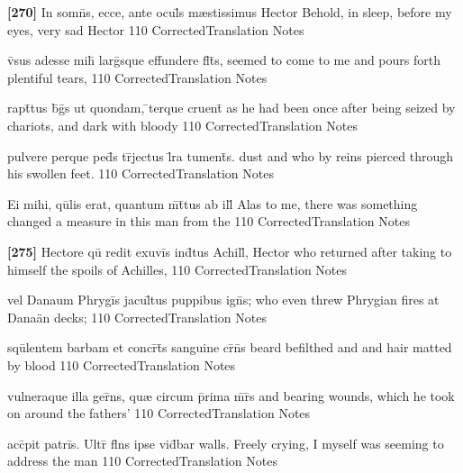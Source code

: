 \latline
  {\textbf{[270]} In somn\={\macron {\i}}s, ecce, ante ocul\={}s m{\ae}stissimus Hector}
  { Behold, in sleep, before my eyes,  very sad Hector   }
  {110}
  { CorrectedTranslation }
  { Notes }


\latline
  {v\={\macron {\i}}sus adesse mih\={\macron {\i}} larg\={}sque effundere fl\={}t\={}s,}
  { seemed to come to me and pours forth plentiful tears, }
  {110}
  { CorrectedTranslation }
  { Notes }

\latline
  {rapt\={}tus b\={\macron {\i}}g\={\macron {\i}}s ut quondam, \={}terque cruent\={}}
  { as he had been once after being seized by chariots, and dark with bloody }
  {110}
  { CorrectedTranslation }
  { Notes }


\latline
  {pulvere perque ped\={}s tr\={}jectus l\={}ra tument\={\macron {\i}}s.}
  { dust and who by reins pierced through his swollen feet. }
  {110}
  { CorrectedTranslation }
  { Notes }


\latline
  {Ei mihi, qu\={}lis erat, quantum m\={}t\={}tus ab ill\={}}
  { Alas to me, there was something changed a measure in this man from the }
  {110}
  { CorrectedTranslation }
  { Notes }


\latline
  {\textbf{[275]} Hectore qu\={\macron {\i}} redit exuvi\={}s ind\={}tus Achill\={\macron {\i}},}
  { Hector who returned after taking to himself the spoils of Achilles, }
  {110}
  { CorrectedTranslation }
  { Notes }


\latline
  {vel Danaum Phrygi\={}s jacul\={}tus puppibus ign\={\macron {\i}}s;}
  { who even threw Phrygian fires at Dana\"an decks; }
  {110}
  { CorrectedTranslation }
  { Notes }


\latline
  {squ\={}lentem barbam et concr\={}t\={}s sanguine cr\={\macron {\i}}n\={\macron {\i}}s}
  { beard befilthed and and hair matted by blood }
  {110}
  { CorrectedTranslation }
  { Notes }


\latline
  {vulneraque illa ger\={}ns, qu{\ae} circum p\={}rima m\={}r\={}s}
  { and bearing wounds, which he took on around the fathers' }
  {110}
  { CorrectedTranslation }
  { Notes }


\latline
  {acc\={}pit patri\={}s.  Ultr\={} fl\={}ns ipse vid\={}bar}
  { walls.  Freely crying, I myself was seeming to address the man}
  {110}
  { CorrectedTranslation }
  { Notes }



